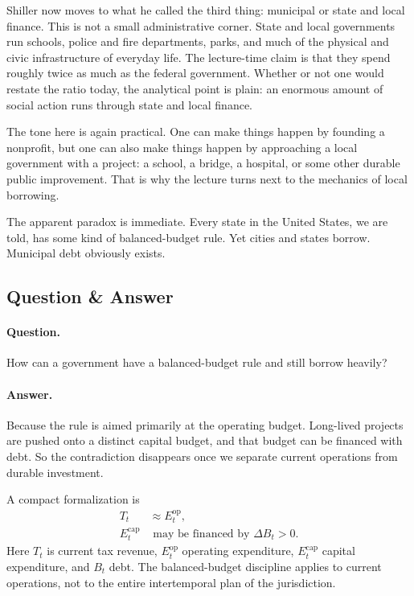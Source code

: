 Shiller now moves to what he called the third thing: municipal or state and local finance. This is not a small administrative corner. State and local governments run schools, police and fire departments, parks, and much of the physical and civic infrastructure of everyday life. The lecture-time claim is that they spend roughly twice as much as the federal government. Whether or not one would restate the ratio today, the analytical point is plain: an enormous amount of social action runs through state and local finance.

The tone here is again practical. One can make things happen by founding a nonprofit, but one can also make things happen by approaching a local government with a project: a school, a bridge, a hospital, or some other durable public improvement. That is why the lecture turns next to the mechanics of local borrowing.

The apparent paradox is immediate. Every state in the United States, we are told, has some kind of balanced-budget rule. Yet cities and states borrow. Municipal debt obviously exists.

\subsection{Question \& Answer}

\paragraph{Question.} How can a government have a balanced-budget rule and still borrow heavily?

\paragraph{Answer.} Because the rule is aimed primarily at the operating budget. Long-lived projects are pushed onto a distinct capital budget, and that budget can be financed with debt. So the contradiction disappears once we separate current operations from durable investment.

A compact formalization is
\begin{align}
T_t &\approx E_t^{\mathrm{op}},\\
E_t^{\mathrm{cap}} &\text{ may be financed by } \Delta B_t>0.
\end{align}
Here \(T_t\) is current tax revenue, \(E_t^{\mathrm{op}}\) operating expenditure, \(E_t^{\mathrm{cap}}\) capital expenditure, and \(B_t\) debt. The balanced-budget discipline applies to current operations, not to the entire intertemporal plan of the jurisdiction.

